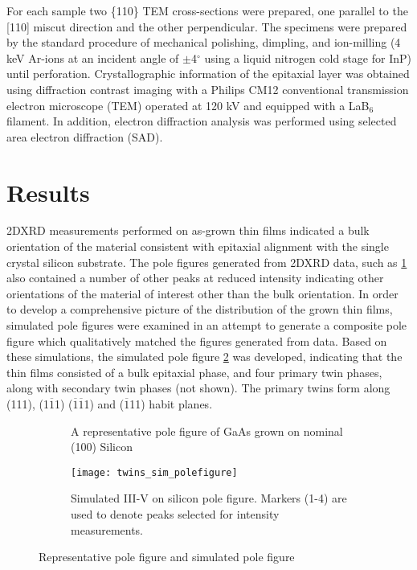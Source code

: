 For each sample two \{110\} TEM cross-sections were prepared, one parallel to 
the [110] miscut direction and the other perpendicular. The specimens were 
prepared by the standard procedure of mechanical polishing, dimpling, and 
ion-milling (4 keV Ar-ions at an incident angle of \(\pm\)4\(^\circ\) using a 
liquid nitrogen cold stage for InP) until perforation. Crystallographic 
information of the epitaxial layer was obtained using diffraction contrast 
imaging with a Philips CM12 conventional transmission electron microscope 
(TEM) operated at 120 kV and equipped with a LaB\(_6\) filament. In addition, 
electron diffraction analysis was performed using selected area electron 
diffraction (SAD).
\section{Results}
2DXRD measurements performed on as-grown thin films indicated a bulk 
orientation of the material consistent with epitaxial alignment with the 
single crystal silicon substrate. The pole figures generated from 2DXRD data, 
such as \cref{fig:twins_pole_example} also contained a number of other peaks 
at reduced intensity indicating other orientations of the material of interest 
other than the bulk orientation. In order to develop a comprehensive picture 
of the distribution of the grown thin films, simulated pole figures were 
examined in an attempt to generate a composite pole figure which qualitatively 
matched the figures generated from data. Based on these simulations, the 
simulated pole figure \cref{fig:twins_sim_polefigure} was developed, 
indicating that the thin films consisted of a bulk epitaxial phase, and four 
primary twin phases, along with secondary twin phases (not shown). The primary twins form 
along (111), (1\(\overline{1}\)1) (\(\overline{1}\overline{1}\)1) and (\(\overline{1}\)11) 
habit planes.
\begin{figure}
    \begin{subfigure}[b]{0.5\linewidth}
        \centering
        \caption{A representative pole figure of GaAs grown on nominal (100) 
        Silicon\label{fig:twins_pole_example}}
    \end{subfigure}
    \begin{subfigure}[b]{0.5\linewidth}
        \centering
        \texttt{[image: twins\_sim\_polefigure]}
        \caption{Simulated III-V on silicon pole figure. Markers (1-4) are used to denote peaks selected
        for intensity measurements.\label{fig:twins_sim_polefigure}}
    \end{subfigure}
    \caption{\label{fig:polefigure_example}Representative pole figure and simulated pole 
    figure}
\end{figure}

